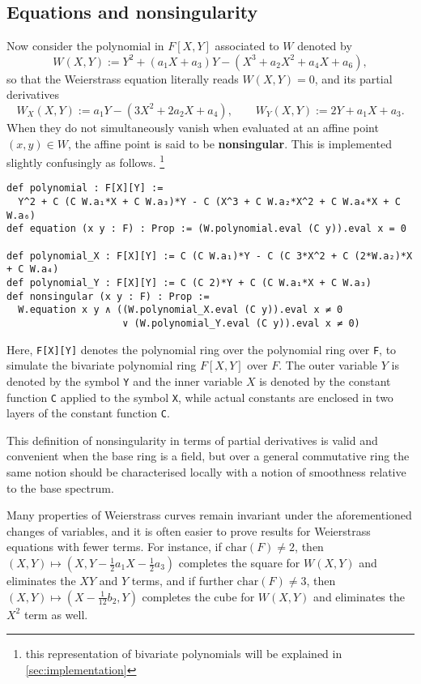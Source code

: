 \documentclass[a4paper,UKenglish,cleveref,autoref,thm-restate]{lipics-v2021}
\begin{document}
\pagebreak

\subsection{Equations and nonsingularity}

Now consider the polynomial in $ F[X, Y] $ associated to $ W $ denoted by
\[ W(X, Y) := Y^2 + (a_1X + a_3)Y - (X^3 + a_2X^2 + a_4X + a_6), \]
so that the Weierstrass equation literally reads $ W(X, Y) = 0 $, and its partial derivatives
\[ W_X(X, Y) := a_1Y - (3X^2 + 2a_2X + a_4), \qquad W_Y(X, Y) := 2Y + a_1X + a_3. \]
When they do not simultaneously vanish when evaluated at an affine point $ (x, y) \in W $, the affine point is said to be \textbf{nonsingular}. This is implemented slightly confusingly as follows. \footnote{this representation of bivariate polynomials will be explained in \cref{sec:implementation}}
\begin{lstlisting}
def polynomial : F[X][Y] :=
  Y^2 + C (C W.a₁*X + C W.a₃)*Y - C (X^3 + C W.a₂*X^2 + C W.a₄*X + C W.a₆)
def equation (x y : F) : Prop := (W.polynomial.eval (C y)).eval x = 0

def polynomial_X : F[X][Y] := C (C W.a₁)*Y - C (C 3*X^2 + C (2*W.a₂)*X + C W.a₄)
def polynomial_Y : F[X][Y] := C (C 2)*Y + C (C W.a₁*X + C W.a₃)
def nonsingular (x y : F) : Prop :=
  W.equation x y ∧ ((W.polynomial_X.eval (C y)).eval x ≠ 0
                    ∨ (W.polynomial_Y.eval (C y)).eval x ≠ 0)
\end{lstlisting}
Here, \texttt{F[X][Y]} denotes the polynomial ring over the polynomial ring over \texttt{F}, to simulate the bivariate polynomial ring $ F[X, Y] $ over $ F $. The outer variable $ Y $ is denoted by the symbol \texttt{Y} and the inner variable $ X $ is denoted by the constant function \texttt{C} applied to the symbol \texttt{X}, while actual constants are enclosed in two layers of the constant function \texttt{C}.

\begin{remark}
This definition of nonsingularity in terms of partial derivatives is valid and convenient when the base ring is a field, but over a general commutative ring the same notion should be characterised locally with a notion of smoothness relative to the base spectrum.
\end{remark}

Many properties of Weierstrass curves remain invariant under the aforementioned changes of variables, and it is often easier to prove results for Weierstrass equations with fewer terms. For instance, if $ \mathrm{char}(F) \ne 2 $, then $ (X, Y) \mapsto (X, Y - \tfrac{1}{2}a_1X - \tfrac{1}{2}a_3) $ completes the square for $ W(X, Y) $ and eliminates the $ XY $ and $ Y $ terms, and if further $ \mathrm{char}(F) \ne 3 $, then $ (X, Y) \mapsto (X - \tfrac{1}{12}b_2, Y) $ completes the cube for $ W(X, Y) $ and eliminates the $ X^2 $ term as well.
\end{document}
